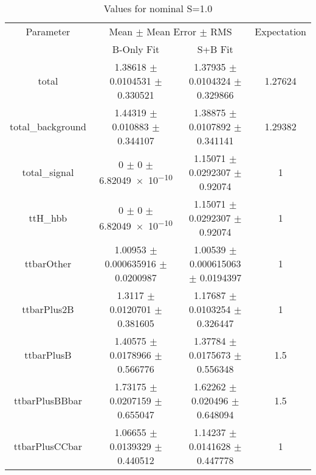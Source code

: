 \begin{table}
\centering
\caption{Values for nominal S=1.0}
\begin{tabular}{cccc}
\toprule
Parameter & \multicolumn{2}{c}{Mean $\pm$ Mean Error $\pm$ RMS} & Expectation\\
 & B-Only Fit & S+B Fit & \\
\midrule
total & \num{1.38618} $\pm$ \num{0.0104531} $\pm$ \num{0.330521} & \num{1.37935} $\pm$ \num{0.0104324} $\pm$ \num{0.329866} & \num{1.27624}\\
total\_background & \num{1.44319} $\pm$ \num{0.010883} $\pm$ \num{0.344107} & \num{1.38875} $\pm$ \num{0.0107892} $\pm$ \num{0.341141} & \num{1.29382}\\
total\_signal & \num{0} $\pm$ \num{0} $\pm$ \num{6.82049e-10} & \num{1.15071} $\pm$ \num{0.0292307} $\pm$ \num{0.92074} & \num{1}\\
ttH\_hbb & \num{0} $\pm$ \num{0} $\pm$ \num{6.82049e-10} & \num{1.15071} $\pm$ \num{0.0292307} $\pm$ \num{0.92074} & \num{1}\\
ttbarOther & \num{1.00953} $\pm$ \num{0.000635916} $\pm$ \num{0.0200987} & \num{1.00539} $\pm$ \num{0.000615063} $\pm$ \num{0.0194397} & \num{1}\\
ttbarPlus2B & \num{1.3117} $\pm$ \num{0.0120701} $\pm$ \num{0.381605} & \num{1.17687} $\pm$ \num{0.0103254} $\pm$ \num{0.326447} & \num{1}\\
ttbarPlusB & \num{1.40575} $\pm$ \num{0.0178966} $\pm$ \num{0.566776} & \num{1.37784} $\pm$ \num{0.0175673} $\pm$ \num{0.556348} & \num{1.5}\\
ttbarPlusBBbar & \num{1.73175} $\pm$ \num{0.0207159} $\pm$ \num{0.655047} & \num{1.62262} $\pm$ \num{0.020496} $\pm$ \num{0.648094} & \num{1.5}\\
ttbarPlusCCbar & \num{1.06655} $\pm$ \num{0.0139329} $\pm$ \num{0.440512} & \num{1.14237} $\pm$ \num{0.0141628} $\pm$ \num{0.447778} & \num{1}\\
\bottomrule
\end{tabular}
\end{table}